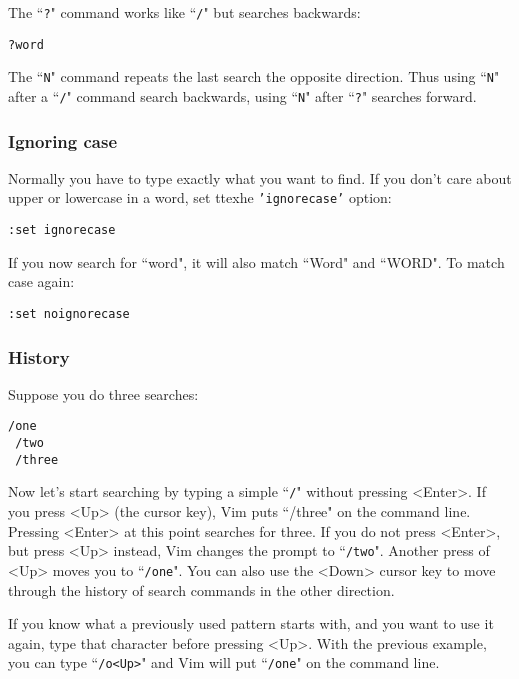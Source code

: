 The ``\texttt{?}" command works like ``\texttt{/}" but searches backwards:

 \begin{Verbatim}[samepage=true]
 ?word
 \end{Verbatim}

The ``\texttt{N}" command repeats the last search the opposite direction.
Thus using ``\texttt{N}" after a ``\texttt{/}" command search backwards, using ``\texttt{N}" after ``\texttt{?}" searches forward.

\subsubsection{Ignoring case}

Normally you have to type exactly what you want to find.
If you don't care about upper or lowercase in a word, set ttexhe \texttt{'ignorecase'} option:

 \begin{Verbatim}[samepage=true]
 :set ignorecase
 \end{Verbatim}

If you now search for ``word", it will also match ``Word" and ``WORD".
To match case again:

 \begin{Verbatim}[samepage=true]
 :set noignorecase
 \end{Verbatim}

\subsubsection{History}

Suppose you do three searches:

 \begin{Verbatim}[samepage=true]
 /one
 /two
 /three
 \end{Verbatim}

Now let's start searching by typing a simple ``\texttt{/}" without pressing <Enter>.
If you press <Up> (the cursor key), Vim puts ``/three" on the command line.
Pressing <Enter> at this point searches for three.
If you do not press <Enter>, but press <Up> instead, Vim changes the prompt to ``\texttt{/two}".
Another press of <Up> moves you to ``\texttt{/one}".
You can also use the <Down> cursor key to move through the history of search commands in the other direction.

If you know what a previously used pattern starts with, and you want to use it again, type that character before pressing <Up>.
With the previous example, you can type ``\texttt{/o<Up>}" and Vim will put ``\texttt{/one}" on the command line.

